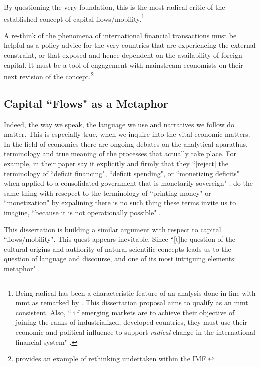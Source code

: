 By questioning the very foundation, this is the most radical critic of the established concept of capital flows/mobility.\footnote{Being radical has been a characteristic feature of an analysis done in line with \ac{mmt} as remarked by \citep[p.~251]{pistor2022}. This dissertation proposal aims to qualify as an \ac{mmt} consistent.   Also, ``[i]f emerging markets are to achieve their objective of joining the ranks of industrialized, developed countries, they must use their economic and political influence to support \textit{radical} change in the international financial system" \citep[p.~235, emphasis added]{kregel2015}.}

A re-think of the phenomena of international financial transactions must be helpful as a policy advice for the very countries that are experiencing the external constraint, or that exposed and hence dependent on the availability of foreign capital. It must be a tool of engagement with mainstream economists on their next revision of the concept.\footnote{\cite{gopinath2017} provides an example of rethinking undertaken within the IMF.}

\subsection{Capital ``Flows" as a Metaphor}\label{sec:metaphor}

Indeed, the way we speak, the language we use and narratives we follow do matter. This is especially true, when we inquire into the vital economic matters. In the field of economics there are ongoing debates on the analytical aparathus, terminology and true meaning of the processes that actually take place. For example, \citeauthor{tymoigne2023} in their paper say it explicitly and firmly that they ``[reject] the terminology of ``deficit financing", ``deficit spending", or ``monetizing deficits" when applied to a consolidated government that is monetarily sovereign" \citep[p.~5]{tymoigne2023}. \citeauthor{fullwiler2022} do the same thing with resepect to the terminology of ``printing money" or ``monetization" by expalining there is no such thing these terms invite us to imagine, ``because it is not operationally possible" \citep[p.~401]{fullwiler2022}. 

This dissertation is building a similar argument with respect to capital ``flows/mobility". This quest appears inevitable. Since ``[t]he question of the cultural origins and authority of natural-scientific concepts leads us to the question of language and discourse, and one of its most intriguing elements: metaphor" \citep[p.~45]{walker2020}. 

